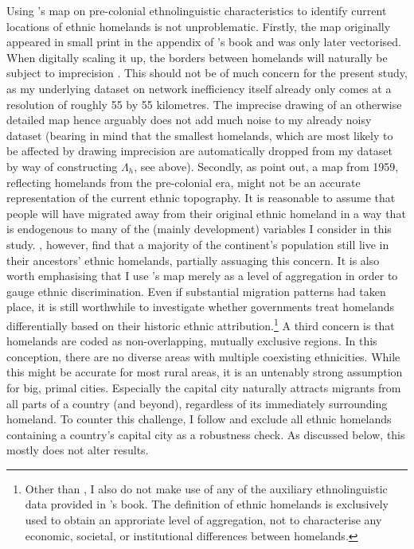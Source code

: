 \documentclass[11pt, oneside]{article}   	%
\begin{document}
Using \citeauthor{Murdock_Africaitspeoples_1959}'s map on pre-colonial ethnolinguistic characteristics to identify current locations of ethnic homelands is not unproblematic. Firstly, the map originally appeared in small print in the appendix of \citeauthor{Murdock_Africaitspeoples_1959}'s book and was only later vectorised. When digitally scaling it up, the borders between homelands will naturally be subject to imprecision \citep{michalopoulos_pre-colonial_2013}. This should not be of much concern for the present study, as my underlying dataset on network inefficiency itself already only comes at a resolution of roughly 55 by 55 kilometres. The imprecise drawing of an otherwise detailed map hence arguably does not add much noise to my already noisy dataset (bearing in mind that the smallest homelands, which are most likely to be affected by drawing imprecision are automatically dropped from my dataset by way of constructing $\Lambda_{h}$, see above). Secondly, as \cite{michalopoulos_pre-colonial_2013} point out, a map from 1959, reflecting homelands from the pre-colonial era, might not be an accurate representation of the current ethnic topography. It is reasonable to assume that people will have migrated away from their original ethnic homeland in a way that is endogenous to many of the (mainly development) variables I consider in this study. \cite{nunn_slave_2011}, however, find that a majority of the continent's population still live in their ancestors' ethnic homelands, partially assuaging this concern. It is also worth emphasising that I use \citeauthor{Murdock_Africaitspeoples_1959}'s map merely as a level of aggregation in order to gauge ethnic discrimination. Even if substantial migration patterns had taken place, it is still worthwhile to investigate whether governments treat homelands differentially based on their historic ethnic attribution.\footnote{Other than \cite{michalopoulos_pre-colonial_2013,michalopoulos_long-run_2016}, I also do not make use of any of the auxiliary ethnolinguistic data provided in \citeauthor{Murdock_Africaitspeoples_1959}'s book. The definition of ethnic homelands is exclusively used to obtain an approriate level of aggregation, not to characterise any economic, societal, or institutional differences between homelands.} A third concern is that homelands are coded as non-overlapping, mutually exclusive regions. In this conception, there are no diverse areas with multiple coexisting ethnicities. While this might be accurate for most rural areas, it is an untenably strong assumption for big, primal cities. Especially the capital city naturally attracts migrants from all parts of a country (and beyond), regardless of its immediately surrounding homeland. To counter this challenge, I follow \cite{Alesina_Ethnicinequality_2016} and exclude all ethnic homelands containing a country's capital city as a robustness check. As discussed below, this mostly does not alter results.
\end{document}
